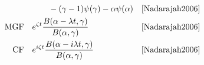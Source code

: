 \begin{table*}[tp!]
\begin{align*}
\\ & \qquad 
- (\gamma -1) \psi(\gamma) - \alpha \psi(\alpha)  &\text{\cite{Nadarajah2006}}
\\
\text{MGF} \quad  &e^{\zeta t }  \frac{B(\alpha-\lambda t, \gamma) }{B(\alpha,\gamma)}  & \text{\cite{Nadarajah2006}}
\\                                                                                                                                              
\text{CF} \quad  & e^{i \zeta t }   \frac{B(\alpha-i \lambda t, \gamma) }{B(\alpha,\gamma)}   & \text{\cite{Nadarajah2006}}
\end{align*}
\end{table*}
